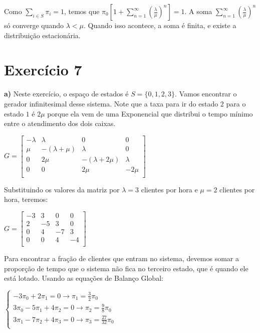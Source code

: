 \documentclass[12pt]{article}
\begin{document}
	Como $ \sum_{i \in S} \pi_i = 1 $, temos que $ \pi_0 \left[1 + \sum_{n=1}^{\infty} \left(\frac{\lambda}{\mu}\right)^n\right] = 1 $. A soma $ \sum_{n=1}^{\infty} \left(\frac{\lambda}{\mu}\right)^n $ só converge quando $ \lambda < \mu $. Quando isso acontece, a soma é finita, e existe a distribuição estacionária.
	
	\section*{Exercício 7}
	
	\textbf{a)} Neste exercício, o espaço de estados é $ S = \{0, 1, 2, 3\} $. Vamos encontrar o gerador infinitesimal desse sistema. Note que a taxa para ir do estado $ 2 $ para o estado $ 1 $ é $ 2\mu $ porque ela vem de uma Exponencial que distribui o tempo mínimo entre o atendimento dos dois caixas.
	
	\begin{center}
		$
		G = \left[\begin{array}{cccc}
			-\lambda  & \lambda          & 0                & 0       \\
			\mu       &  -(\lambda+\mu)  & \lambda          & 0       \\
			0         & 2\mu             & -(\lambda+2\mu)  & \lambda \\
			0         & 0                & 2\mu             & -2\mu   \\ 
		\end{array}\right]
		$
	\end{center}
	
	Substituindo os valores da matriz por $ \lambda = 3 $ clientes por hora e $ \mu = 2 $ clientes por hora, teremos:
	
	\begin{center}
		$
		G = \left[\begin{array}{cccc}
			-3 & 3  & 0   & 0  \\
			2  & -5 & 3   & 0  \\
			0  & 4  & -7  & 3  \\
			0  & 0  & 4   & -4 \\ 
		\end{array}\right]
		$
	\end{center}
	
	Para encontrar a fração de clientes que entram no sistema, devemos somar a proporção de tempo que o sistema não fica no terceiro estado, que é quando ele está lotado. Usando as equações de Balanço Global:
	
	$ \begin{cases}
	-3 \pi_0 + 2 \pi_1 = 0 \to \pi_1 = \frac{3}{2} \pi_0\\
	3 \pi_0 -5 \pi_1 + 4 \pi_2 = 0 \to \pi_2 = \frac{9}{8} \pi_0\\
	3 \pi_1 -7 \pi_2 + 4 \pi_3 = 0 \to \pi_3 = \frac{27}{32} \pi_0\\
	\end{cases} $
	
\end{document}

